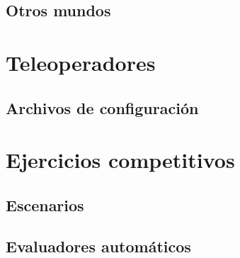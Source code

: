 \subsection{Otros mundos}


\section{Teleoperadores}
\subsection{Archivos de configuración}

\section{Ejercicios competitivos}
\subsection{Escenarios}
\subsection{Evaluadores automáticos}